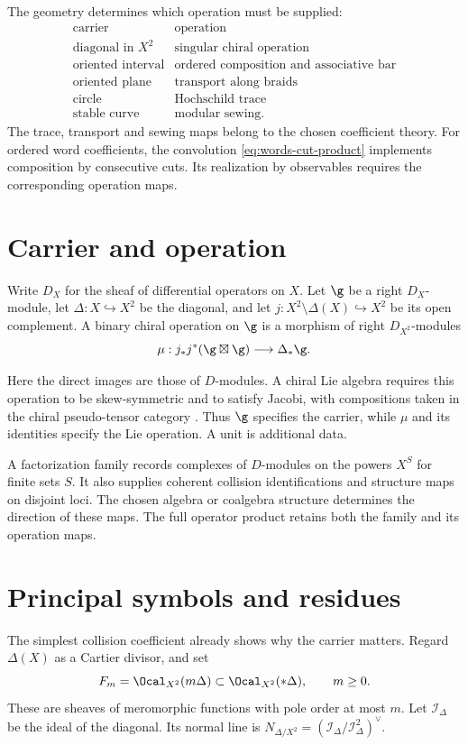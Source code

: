 The geometry determines which operation must be supplied:
\[
\begin{array}{c|c}
\text{carrier}&\text{operation}\\ \hline
\text{diagonal in }X^2&\text{singular chiral operation}\\
\text{oriented interval}&\text{ordered composition and associative bar}\\
\text{oriented plane}&\text{transport along braids}\\
\text{circle}&\text{Hochschild trace}\\
\text{stable curve}&\text{modular sewing}.
\end{array}
\]
The trace, transport and sewing maps belong to the chosen coefficient
theory. For ordered word coefficients, the convolution
\eqref{eq:words-cut-product} implements composition by consecutive cuts.
Its realization by observables requires the corresponding operation maps.

\section{Carrier and operation}
Write $D_X$ for the sheaf of differential operators on $X$. Let $\g$ be
a right $D_X$-module, let $\Delta:X\hookrightarrow X^2$ be the diagonal,
and let $j:X^2\setminus\Delta(X)\hookrightarrow X^2$ be its open complement.
A binary chiral operation on $\g$ is a morphism of right $D_{X^2}$-modules
\[
 \mu:j_*j^*(\g\boxtimes\g)\longrightarrow \Delta_*\g.
\]

Here the direct images are those of $D$-modules. A chiral Lie algebra
requires this operation to be skew-symmetric and to satisfy Jacobi,
with compositions taken in the chiral pseudo-tensor category
\cite[\S\S0.8, 3.1.1--3.1.2]{BD04}. Thus $\g$ specifies the carrier,
while $\mu$ and its identities specify the Lie operation. A unit is
additional data.

A factorization family records complexes of $D$-modules on the powers
$X^S$ for finite sets $S$. It also supplies coherent collision
identifications and structure maps on disjoint loci. The chosen algebra or coalgebra
structure determines the direction of these maps. The full operator
product retains both the family and its operation maps.

\section{Principal symbols and residues}
The simplest collision coefficient already shows why the carrier matters.
Regard $\Delta(X)$ as a Cartier divisor, and set
\[
 F_m=\Ocal_{X^2}(m\Delta)\subset\Ocal_{X^2}(*\Delta),\qquad m\geq0.
\]
These are sheaves of meromorphic functions with pole order at most $m$.
Let $\mathcal I_\Delta$ be the ideal of the diagonal. Its normal line is
$N_{\Delta/X^2}=(\mathcal I_\Delta/\mathcal I_\Delta^2)^\vee$.

